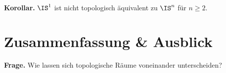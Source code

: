 \documentclass[language=ngerman]{TemplateLecture} %
\begin{document}
\textbf{Korollar.} $\IS^1$ ist nicht topologisch äquivalent zu $\IS^n$ für $n \geq 2$.





\chapter*{Zusammenfassung \& Ausblick}

\textbf{Frage.} Wie lassen sich topologische Räume voneinander unterscheiden?
\end{document}
